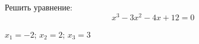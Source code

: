 \begin{ex}
	Решить уравнение:
	$$ x^3-3x^2-4x+12=0 $$
	\begin{answer}
		$x_1=-2$; $x_2=2$; $x_3=3$
	\end{answer}
\end{ex}